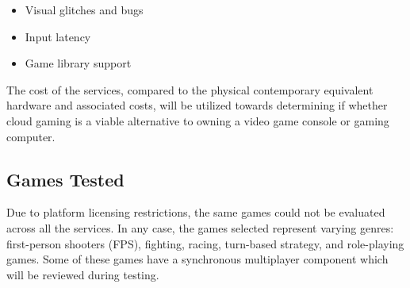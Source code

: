 \documentclass[titlepage, 12pt]{article}
\begin{document}
	\begin{itemize}
	\item {Visual glitches and bugs}
	\item {Input latency}
	\item {Game library support}
	\end{itemize}
	
	The cost of the services, compared to the physical contemporary equivalent hardware and associated costs, will be utilized towards determining if whether cloud gaming is a viable alternative to owning a video game console or gaming computer.

	\subsection{Games Tested}
	
	Due to platform licensing restrictions, the same games could not be evaluated across all the services. In any case, the games selected represent varying genres: first-person shooters (FPS), fighting, racing, turn-based strategy, and role-playing games. Some of these games have a synchronous multiplayer component which will be reviewed during testing.
	
\end{document}
